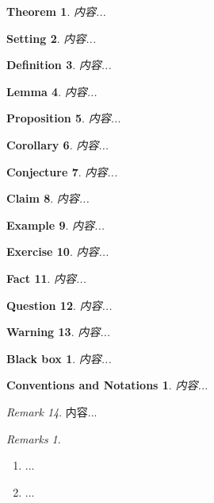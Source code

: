 \documentclass{article}
\numberwithin{equation}{section}
\theoremstyle{plain}
\newtheorem{theorem}{Theorem}[section]
\newtheorem{setting}[theorem]{Setting}
\newtheorem{definition}[theorem]{Definition}
\newtheorem{lemma}[theorem]{Lemma}
\newtheorem{proposition}[theorem]{Proposition}
\newtheorem{corollary}[theorem]{Corollary}
\newtheorem{conjecture}[theorem]{Conjecture}
\newtheorem{claim}[theorem]{Claim}
\newtheorem{eg}[theorem]{Example}
\newtheorem{ex}[theorem]{Exercise}
\newtheorem{fact}[theorem]{Fact}
\newtheorem{ques}[theorem]{Question}
\newtheorem{warning}[theorem]{Warning}
\newtheorem*{bbox}{Black box}
\newtheorem*{notation}{Conventions and Notations}
\numberwithin{equation}{section}
\theoremstyle{remark}
\newtheorem{remark}[theorem]{Remark}
\newtheorem*{remarks}{Remarks}
\begin{document}
\begin{theorem}
内容...
\end{theorem}

\begin{setting}
内容...
\end{setting}

\begin{definition}
内容...
\end{definition}

\begin{lemma}
内容...
\end{lemma}

\begin{proposition}
内容...
\end{proposition}

\begin{corollary}
内容...
\end{corollary}
\begin{conjecture}
内容...
\end{conjecture}
\begin{claim}
内容...
\end{claim}
\begin{eg}
内容...
\end{eg}
\begin{ex}
内容...
\end{ex}
\begin{fact}
内容...
\end{fact}
\begin{ques}
内容...
\end{ques}
\begin{warning}
内容...
\end{warning}
\begin{bbox}
内容...
\end{bbox}
\begin{notation}
内容...
\end{notation}

\begin{remark}
内容...
\end{remark}

\begin{remarks}\
\begin{enumerate}
\item ...
\item ...
\end{enumerate}
\end{remarks}
\end{document}
